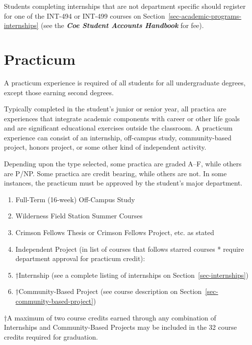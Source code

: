 \documentclass[
  letterpaper,
]{scrbook}
\providecommand{\tightlist}{%
  \setlength{\itemsep}{0pt}\setlength{\parskip}{0pt}}
\begin{document}
Students completing internships that are not department specific should
register for one of the INT-494 or INT-499 courses on
Section~\ref{sec-academic-programs-internships} (see the
\textbf{\emph{Coe Student Accounts Handbook}} for fee).

\section{Practicum}\label{sec-practicum}

A practicum experience is required of all students for all undergraduate
degrees, except those earning second degrees.

Typically completed in the student's junior or senior year, all practica
are experiences that integrate academic components with career or other
life goals and are significant educational exercises outside the
classroom. A practicum experience can consist of an internship,
off-campus study, community-based project, honors project, or some other
kind of independent activity.

Depending upon the type selected, some practica are graded A--F, while
others are P/NP. Some practica are credit bearing, while others are not.
In some instances, the practicum must be approved by the student's major
department.

\begin{enumerate}
\def\labelenumi{\arabic{enumi}.}
\tightlist
\item
  Full-Term (16-week) Off-Campus Study
\item
  Wilderness Field Station Summer Courses
\item
  Crimson Fellows Thesis or Crimson Fellows Project, etc. as stated
\item
  Independent Project (in list of courses that follows starred courses *
  require department approval for practicum credit):
\item
  †Internship (see a complete listing of internships on
  Section~\ref{sec-internships})
\item
  †Community-Based Project (see course description on
  Section~\ref{sec-community-based-project})
\end{enumerate}

†A maximum of two course credits earned through any combination of
Internships and Community-Based Projects may be included in the 32
course credits required for graduation.
\end{document}
